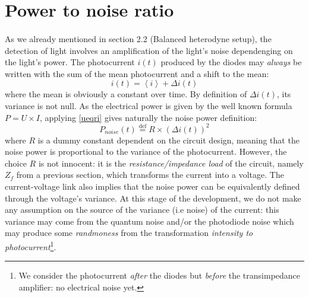 \documentclass[10pt]{report}
\begin{document}
\section{Power to noise ratio}
\paragraph{}

As we already mentioned in section 2.2 (Balanced heterodyne setup), the detection of light involves an amplification of the light's noise dependenging on the light's power. The photocurrent $i(t)$ produced by the diodes may \textit{always} be written with the sum of the mean photocurrent and a shift to the mean:
\begin{equation}
\label{i_split_delta_i}
i(t) = \left\langle i \right\rangle + \Delta i(t)
\end{equation}
where the mean is obviously a constant over time. By definition of $\Delta i(t)$, its variance is not null. As the electrical power is given by the well known formula $P = U \times I$, applying \eqref{ueqri} gives naturally the noise power definition:
\begin{equation}
\label{def_p_noise}
P_{noise}(t) \stackrel{\text{def}}{=} R \times (\Delta i(t))^2 
\end{equation}
where $R$ is a dummy constant dependent on the circuit design, meaning that the noise power is proportional to the variance of the photocurrent. However, the choice $R$ is not innocent: it is the \textit{resistance/impedance load} of the circuit, namely $Z_f$ from a previous section, which transforms the current into a voltage. The current-voltage link also implies that the noise power can be equivalently defined through the voltage's variance. At this stage of the development, we do not make any assumption on the source of the variance (i.e noise) of the current: this variance may come from the quantum noise and/or the photodiode noise which may produce some \textit{randmoness} from the transformation \textit{intensity to photocurrent}\footnote{We consider the photocurrent \textit{after} the diodes but \textit{before} the transimpedance amplifier: no electrical noise yet.}.
\end{document}
